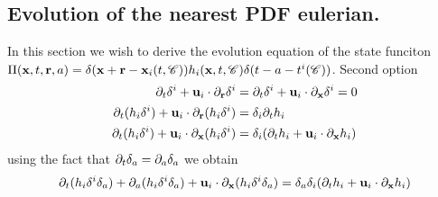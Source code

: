 
\subsection{Evolution of the nearest PDF eulerian. }
In this section we wish to derive the evolution equation of the state funciton $\Pi(\textbf{x},t,\textbf{r},a) =  \delta(\textbf{x} + \textbf{r}- \textbf{x}_i(t,\mathscr{C}))h_i(\textbf{x},t,\mathscr{C})\delta(t - a-t^i(\mathscr{C}))$. 
Second option 
\begin{align*}
    \partial_t \delta^i + \textbf{u}_i \cdot \partial_\textbf{r} \delta^i &= \partial_t \delta^i + \textbf{u}_i \cdot \partial_\textbf{x} \delta^i  = 0\\
    \partial_t (h_i \delta^i) + \textbf{u}_i \cdot \partial_\textbf{r} (h_i \delta^i) 
    &= \delta_i \partial_t h_i\\
    \partial_t (h_i \delta^i) + \textbf{u}_i \cdot \partial_\textbf{x} (h_i \delta^i) 
    &= \delta_i (\partial_t h_i + \textbf{u}_i \cdot \partial_\textbf{x} h_i)\\
\end{align*}
using the fact that $\partial_t \delta_a = \partial_a \delta_a$ we obtain 
\begin{align*}
    \partial_t (h_i \delta^i \delta_a) + \partial_a ( h_i \delta^i \delta_a) + \textbf{u}_i \cdot \partial_\textbf{x} (h_i \delta^i\delta_a) 
    &=  \delta_a \delta_i (\partial_t h_i + \textbf{u}_i \cdot \partial_\textbf{x} h_i)\\
\end{align*}
